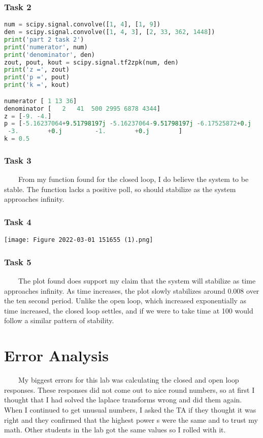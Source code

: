 \documentclass[11pt,a4]{article}
\begin{document}
\subsubsection{Task 2}

\begin{lstlisting}[language=Python]
num = scipy.signal.convolve([1, 4], [1, 9])
den = scipy.signal.convolve([1, 4, 3], [2, 33, 362, 1448])
print('part 2 task 2')
print('numerator', num)
print('denominator', den)
zout, pout, kout = scipy.signal.tf2zpk(num, den)
print('z =', zout)
print('p =', pout)
print('k =', kout)

numerator [ 1 13 36]
denominator [   2   41  500 2995 6878 4344]
z = [-9. -4.]
p = [-5.16237064+9.51798197j -5.16237064-9.51798197j -6.17525872+0.j
 -3.        +0.j         -1.        +0.j        ]
k = 0.5
\end{lstlisting}

\subsubsection{Task 3}

\ \ \ \ From my function found for the closed loop, I do believe the system to be stable. The function lacks a positive poll, so should stabilize as the system approaches infinity.

\subsubsection{Task 4}

\texttt{[image: Figure 2022-03-01 151655 (1).png]}

\subsubsection{Task 5}

\ \ \ \ The plot found does support my claim that the system will stabilize as time approaches infinity. As time increases, the plot slowly stabilizes around 0.008 over the ten second period. Unlike the open loop, which increased exponentially as  time increased, the closed loop settles, and if we were to take time at 100 would follow a similar pattern of stability.

\section{Error Analysis}
\ \ \ \ My biggest errors for this lab was calculating the closed and open loop responses. These responses did not come out to nice round numbers, so at first I thought that I had solved the laplace transforms wrong and did them again. When I continued to get unusual numbers, I asked the TA if they thought it was right and they confirmed that the highest power s were the same and to trust my math. Other students in the lab got the same values so I rolled with it.
\end{document}
